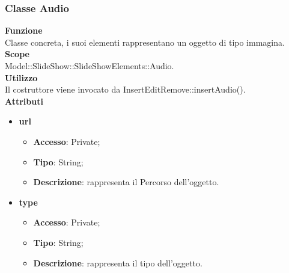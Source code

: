 {	\subsubsection{Classe Audio}{
		\label{Audio}
		\textbf{Funzione}\\
			\indent Classe concreta, i suoi elementi rappresentano un oggetto di tipo immagina.\\
	   	\textbf{Scope}\\
			\indent Model::SlideShow::SlideShowElements::Audio.\\
		\textbf{Utilizzo}\\
			\indent Il costruttore viene invocato da InsertEditRemove::insertAudio().\\
		\textbf{Attributi}
		\begin{itemize}
			\item \textbf{url}
			\begin{itemize}
				\item \textbf{Accesso}: Private;
				\item \textbf{Tipo}: String;
				\item \textbf{Descrizione}: rappresenta il Percorso dell’oggetto.
			\end{itemize}
			\item \textbf{type}
			\begin{itemize}
				\item \textbf{Accesso}: Private;
				\item \textbf{Tipo}: String;
				\item \textbf{Descrizione}: rappresenta il tipo dell'oggetto.
			\end{itemize}
		\end{itemize}
		}
	
}
